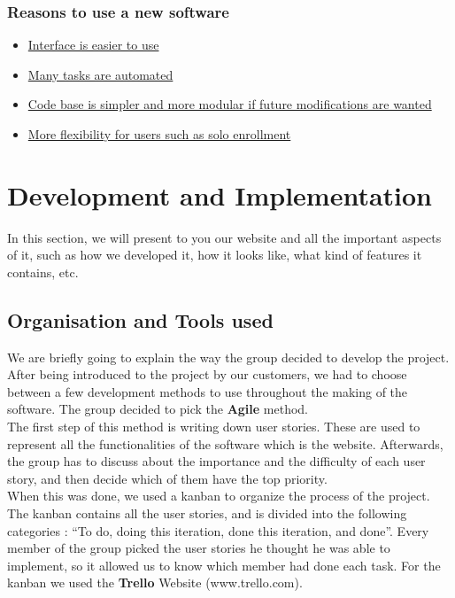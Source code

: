 \documentclass[a4paper, 12pt]{article}
\begin{document}
\subsubsection*{Reasons to use a new software}


	\begin{itemize}
		\item \underline{Interface is easier to use}
		\item \underline{Many tasks are automated}
		\item \underline{Code base is simpler and more modular if future modifications are wanted}
		\item \underline{More flexibility for users such as solo enrollment}
	\end{itemize}


\newpage





\section{Development and Implementation}
In this section, we will present to you our website and all the important aspects of it, such as how we developed it, how it looks like, what kind of features it contains, etc.

\subsection{Organisation and Tools used}

We are briefly going to explain the way the group decided to develop the project. After being introduced to the project by our customers, we had to choose between a few development methods to use throughout the making of the software. The group decided to pick  the \textbf{Agile} method. \\

The first step of this method is writing down user stories. These are used to represent all the functionalities of the software which is the website. Afterwards, the group has to discuss about the importance and the difficulty of each user story, and then decide which of them have the top priority. \\

When this was done, we used a kanban to organize the process of the project. The kanban contains all the user stories, and is divided into the following categories : “To do, doing this iteration, done this iteration, and done”. Every member of the group picked the user stories he thought he was able to implement, so it allowed us to know which member had done each task. For the kanban we used the \textbf{Trello} Website (www.trello.com). \\
\end{document}
